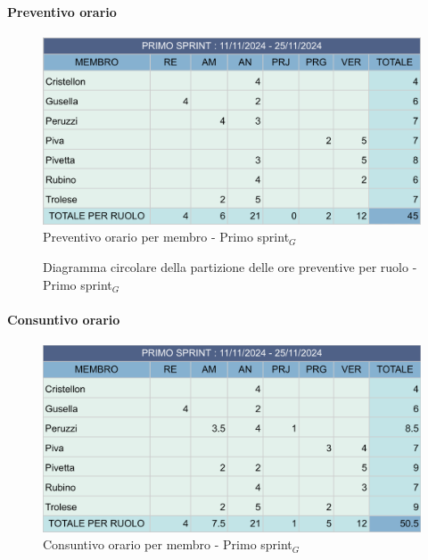 \documentclass[10pt]{article}
\begin{document}
{{    \paragraph{Preventivo orario}\mbox{}\vspace{0.4em}

    \begin{figure}[ht]
    	\centering
    	\includegraphics[width=0.6\linewidth]{preventivoOrePrimoSprint.png}
    	\caption{Preventivo orario per membro - Primo sprint$_G$}
    	\label{fig:Preventivo orario per membro - primo sprint$_G$}
    \end{figure}

    \begin{figure}[H]
        \centering
        \caption{Diagramma circolare della partizione delle ore preventive per ruolo - Primo sprint$_G$ }
        \label{fig:Diagramma circolare della partizione delle ore preventive per ruolo - primo sprint$_G$}
    \end{figure}
    
    \paragraph{Consuntivo orario}\mbox{}\vspace{0.4em}

    \begin{figure}[ht]
    	\centering
    	\includegraphics[width=0.6\linewidth]{consuntivoOrePrimoSprint.png}
    	\caption{Consuntivo orario per membro - Primo sprint$_G$}
    	\label{fig:Consuntivo orario per membro - primo sprint$_G$}
    \end{figure}

}}
\end{document}
